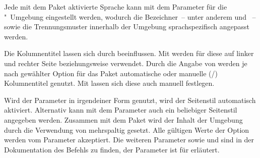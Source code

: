 \begin{DeclareEntity*}{}
\begin{DeclareEntity*}{}
\begin{DeclareEntity*}{}
\begin{Declaration}
\begin{Declaration}
\begin{Declaration}
\begin{Declaration}
\begin{Declaration}
\begin{Declaration}
\begin{Declaration}
\begin{Declaration}
\begin{Declaration}
\begin{Declaration}
\begin{Declaration}
Jede mit dem Paket  aktivierte Sprache kann mit dem Parameter 
 für die 
"~Umgebung eingestellt werden, wodurch die 
Bezeichner~-- unter anderem  und ~-- 
sowie die Trennungsmuster innerhalb der Umgebung sprachspezifisch angepasst 
werden. 

%
Die Kolumnentitel lassen sich durch  
beeinflussen. Mit  
werden für diese auf linker und rechter Seite  
beziehungsweise  verwendet. Durch die Angabe von
 werden je nach 
gewählter Option für das Paket  automatische oder 
manuelle (/) Kolumnentitel genutzt. Mit 
lassen sich diese auch manuell festlegen.

Wird der Parameter  in irgendeiner Form 
genutzt, wird der Seitenstil  automatisch aktiviert. 
Alternativ kann mit dem Parameter 
auch ein beliebiger Seitenstil angegeben werden. Zusammen mit dem Paket 
 wird der Inhalt der Umgebung durch die Verwendung von 
 mehrspaltig gesetzt. 
Alle gültigen Werte der Option  werden vom Parameter
 akzeptiert. Die weiteren Parameter 
 sowie 
 und 
 sind in der Dokumentation des Befehls 
 zu finden, der Parameter 
 ist für  erläutert.
\end{Declaration}
\end{Declaration}
\end{Declaration}
\end{Declaration}
\end{Declaration}
\end{Declaration}
\end{Declaration}
\end{Declaration}
\end{Declaration}
\end{Declaration}
\end{Declaration}


\end{DeclareEntity*}
\end{DeclareEntity*}
\end{DeclareEntity*}
